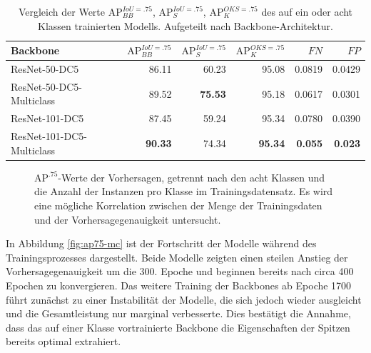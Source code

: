 \begin{table}[h]
\centering
\begin{tabular}{lrrrrr}
\toprule
Backbone & $\text{AP}^{IoU=.75}_{BB}$ & $\text{AP}^{IoU=.75}_{S}$ & $\text{AP}^{OKS=.75}_{K}$ & $FN$ & $FP$\\
\midrule
ResNet-50-DC5 & 86.11 & 60.23 & 95.08 & 0.0819 & 0.0429 \\
ResNet-50-DC5-Multiclass & 89.52 & \textbf{75.53} & 95.18 & 0.0617 & 0.0301 \\
\hline
ResNet-101-DC5 & 87.45 & 59.24 & 95.34 & 0.0780 & 0.0390 \\
ResNet-101-DC5-Multiclass & \textbf{90.33} & 74.34 & \textbf{95.34} & \textbf{0.055} & \textbf{0.023} \\
\bottomrule
\end{tabular}
\caption{Vergleich der Werte $\text{AP}^{IoU=.75}_{BB}$, $\text{AP}^{IoU=.75}_{S}$, $\text{AP}^{OKS=.75}_{K}$ des auf ein oder acht Klassen trainierten Modells. Aufgeteilt nach Backbone-Architektur.}
\label{tab:multiclass}
\end{table}
\begin{figure}[h]
    \centering
    \caption{$\text{AP}^{.75}$-Werte der Vorhersagen, getrennt nach den acht Klassen und die Anzahl der Instanzen pro Klasse im Trainingsdatensatz. Es wird eine mögliche Korrelation zwischen der Menge der Trainingsdaten und der Vorhersagegenauigkeit untersucht.}
    \label{fig:correl}
\end{figure}
In Abbildung \ref{fig:ap75-mc} ist der Fortschritt der Modelle während des Trainingsprozesses dargestellt. Beide Modelle zeigten einen steilen Anstieg der Vorhersagegenauigkeit um die 300. Epoche und beginnen bereits nach circa 400 Epochen zu konvergieren. Das weitere Training der Backbones ab Epoche 1700 führt zunächst zu einer Instabilität der Modelle, die sich jedoch wieder ausgleicht und die Gesamtleistung nur marginal verbesserte. Dies bestätigt die Annahme, dass das auf einer Klasse vortrainierte Backbone die Eigenschaften der Spitzen bereits optimal extrahiert.

